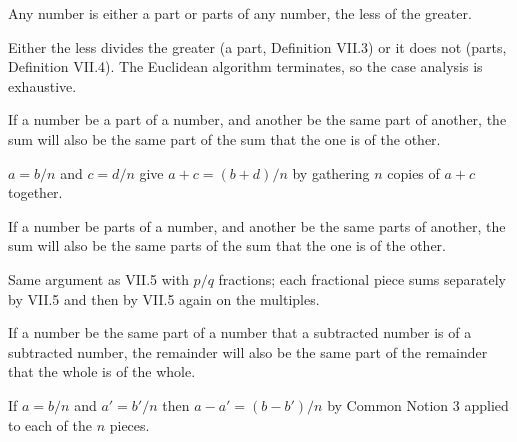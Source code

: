\begin{claim}
\label{prop:VII.4}
Any number is either a part or parts of any number, the less of the
greater.
\end{claim}
\begin{evidence}
\label{ev:VII.4}
Either the less divides the greater (a part, Definition VII.3) or it
does not (parts, Definition VII.4).  The Euclidean algorithm
terminates, so the case analysis is exhaustive.
\end{evidence}

\begin{claim}
\label{prop:VII.5}
If a number be a part of a number, and another be the same part of
another, the sum will also be the same part of the sum that the one
is of the other.
\end{claim}
\begin{evidence}
\label{ev:VII.5}
$a = b/n$ and $c = d/n$ give $a + c = (b + d)/n$ by gathering $n$
copies of $a + c$ together.
\end{evidence}

\begin{claim}
\label{prop:VII.6}
If a number be parts of a number, and another be the same parts of
another, the sum will also be the same parts of the sum that the one
is of the other.
\end{claim}
\begin{evidence}
\label{ev:VII.6}
Same argument as VII.5 with $p/q$ fractions; each fractional piece
sums separately by VII.5 and then by VII.5 again on the multiples.
\end{evidence}

\begin{claim}
\label{prop:VII.7}
If a number be the same part of a number that a subtracted number is
of a subtracted number, the remainder will also be the same part of
the remainder that the whole is of the whole.
\end{claim}
\begin{evidence}
\label{ev:VII.7}
If $a = b/n$ and $a' = b'/n$ then $a - a' = (b - b')/n$ by Common
Notion 3 applied to each of the $n$ pieces.
\end{evidence}

